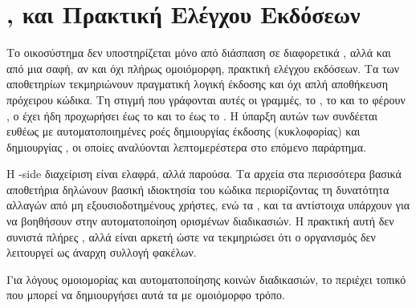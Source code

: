 \section{,  και Πρακτική Ελέγχου Εκδόσεων}
\label{sec:appendix_versioning_governance}

Το οικοσύστημα δεν υποστηρίζεται μόνο από διάσπαση σε διαφορετικά , αλλά και από μια σαφή,
αν και όχι πλήρως ομοιόμορφη, πρακτική ελέγχου εκδόσεων. Τα  των αποθετηρίων τεκμηριώνουν πραγματική λογική έκδοσης
και όχι απλή αποθήκευση πρόχειρου κώδικα.
Τη στιγμή που γράφονται αυτές οι γραμμές, το \texttt{}, το \texttt{}
και το \texttt{} φέρουν  \texttt{}, ο \texttt{} έχει ήδη προχωρήσει
έως το \texttt{} και το \texttt{} έως το \texttt{}.
Η ύπαρξη αυτών των  συνδέεται ευθέως με αυτοματοποιημένες ροές δημιουργίας έκδοσης (κυκλοφορίας) και δημιουργίας ,
οι οποίες αναλύονται λεπτομερέστερα στο επόμενο παράρτημα.

Η -side διαχείριση είναι ελαφρά, αλλά παρούσα. Τα αρχεία \texttt{} στα περισσότερα βασικά αποθετήρια δηλώνουν
βασική ιδιοκτησία του κώδικα περιορίζοντας τη δυνατότητα αλλαγών από μη εξουσιοδοτημένους χρήστες,
ενώ τα \texttt{}, \texttt{} και τα αντίστοιχα  υπάρχουν για να βοηθήσουν 
στην αυτοματοποίηση ορισμένων διαδικασιών. Η πρακτική αυτή δεν συνιστά πλήρες ,
αλλά είναι αρκετή ώστε να τεκμηριώσει ότι ο οργανισμός δεν λειτουργεί ως άναρχη συλλογή φακέλων.

Για λόγους ομοιομορίας και αυτοματοποίησης κοινών διαδικασιών, το \texttt{} 
περιέχει τοπικό  που μπορεί να δημιουργήσει αυτά τα  με ομοιόμορφο τρόπο.


\begin{table}[H]
\centering
\caption{Ενδείξεις ελέγχου εκδόσεων,  πρακτικής και ελαφράς διακυβέρνησης στα βασικά αποθετήρια}
\label{tab:appendix_versioning_workflow_conventions}

\end{table}
